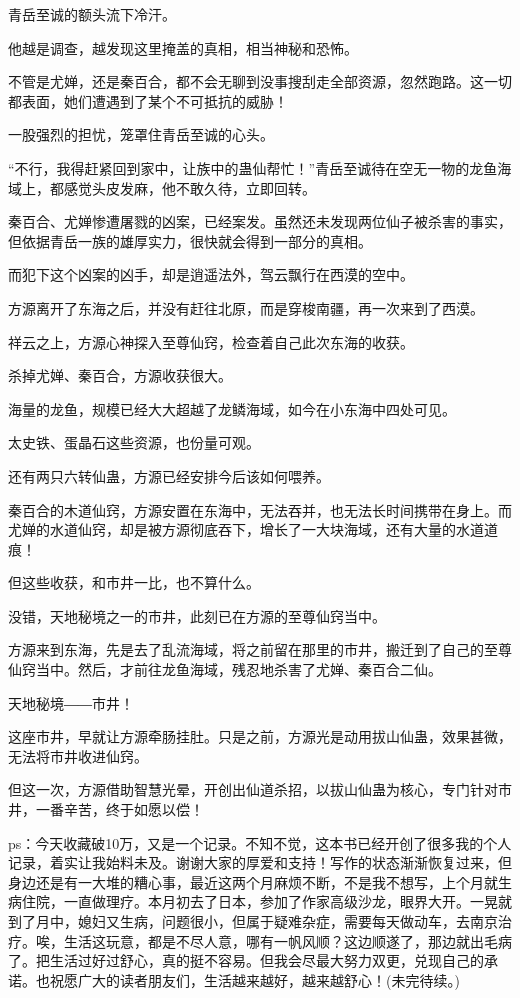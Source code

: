 \begin{this_body}
青岳至诚的额头流下冷汗。

他越是调查，越发现这里掩盖的真相，相当神秘和恐怖。

不管是尤婵，还是秦百合，都不会无聊到没事搜刮走全部资源，忽然跑路。这一切都表面，她们遭遇到了某个不可抵抗的威胁！

一股强烈的担忧，笼罩住青岳至诚的心头。

“不行，我得赶紧回到家中，让族中的蛊仙帮忙！”青岳至诚待在空无一物的龙鱼海域上，都感觉头皮发麻，他不敢久待，立即回转。

秦百合、尤婵惨遭屠戮的凶案，已经案发。虽然还未发现两位仙子被杀害的事实，但依据青岳一族的雄厚实力，很快就会得到一部分的真相。

而犯下这个凶案的凶手，却是逍遥法外，驾云飘行在西漠的空中。

方源离开了东海之后，并没有赶往北原，而是穿梭南疆，再一次来到了西漠。

祥云之上，方源心神探入至尊仙窍，检查着自己此次东海的收获。

杀掉尤婵、秦百合，方源收获很大。

海量的龙鱼，规模已经大大超越了龙鳞海域，如今在小东海中四处可见。

太史铁、蛋晶石这些资源，也份量可观。

还有两只六转仙蛊，方源已经安排今后该如何喂养。

秦百合的木道仙窍，方源安置在东海中，无法吞并，也无法长时间携带在身上。而尤婵的水道仙窍，却是被方源彻底吞下，增长了一大块海域，还有大量的水道道痕！

但这些收获，和市井一比，也不算什么。

没错，天地秘境之一的市井，此刻已在方源的至尊仙窍当中。

方源来到东海，先是去了乱流海域，将之前留在那里的市井，搬迁到了自己的至尊仙窍当中。然后，才前往龙鱼海域，残忍地杀害了尤婵、秦百合二仙。

天地秘境――市井！

这座市井，早就让方源牵肠挂肚。只是之前，方源光是动用拔山仙蛊，效果甚微，无法将市井收进仙窍。

但这一次，方源借助智慧光晕，开创出仙道杀招，以拔山仙蛊为核心，专门针对市井，一番辛苦，终于如愿以偿！

ps：今天收藏破10万，又是一个记录。不知不觉，这本书已经开创了很多我的个人记录，着实让我始料未及。谢谢大家的厚爱和支持！写作的状态渐渐恢复过来，但身边还是有一大堆的糟心事，最近这两个月麻烦不断，不是我不想写，上个月就生病住院，一直做理疗。本月初去了日本，参加了作家高级沙龙，眼界大开。一晃就到了月中，媳妇又生病，问题很小，但属于疑难杂症，需要每天做动车，去南京治疗。唉，生活这玩意，都是不尽人意，哪有一帆风顺？这边顺遂了，那边就出毛病了。把生活过好过舒心，真的挺不容易。但我会尽最大努力双更，兑现自己的承诺。也祝愿广大的读者朋友们，生活越来越好，越来越舒心！(未完待续。)

\end{this_body}

